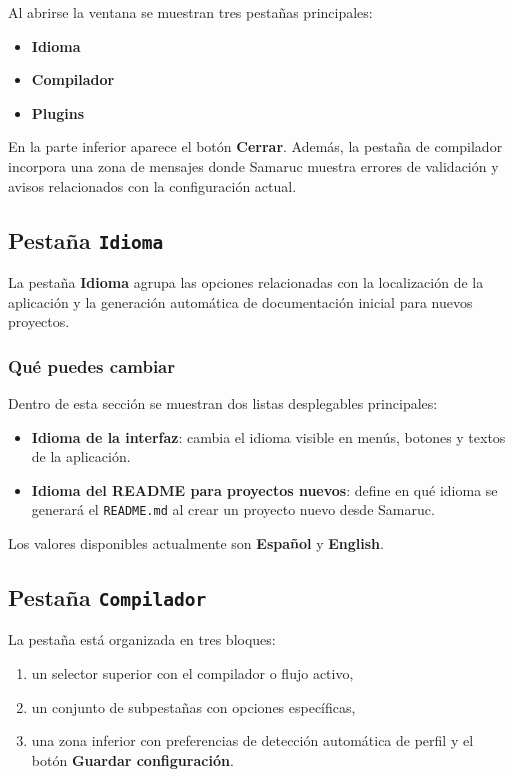 \documentclass[../../main.tex]{subfiles}
\begin{document}
Al abrirse la ventana se muestran tres pestañas principales:

\begin{itemize}
    \item \textbf{Idioma}
    \item \textbf{Compilador}
    \item \textbf{Plugins}
\end{itemize}

En la parte inferior aparece el botón \textbf{Cerrar}. Además, la pestaña de compilador incorpora una zona de mensajes donde Samaruc muestra errores de validación y avisos relacionados con la configuración actual.

\subsection{Pestaña \texttt{Idioma}}

La pestaña \textbf{Idioma} agrupa las opciones relacionadas con la localización de la aplicación y la generación automática de documentación inicial para nuevos proyectos.

\subsubsection{Qué puedes cambiar}

Dentro de esta sección se muestran dos listas desplegables principales:

\begin{itemize}
    \item \textbf{Idioma de la interfaz}: cambia el idioma visible en menús, botones y textos de la aplicación.
    \item \textbf{Idioma del README para proyectos nuevos}: define en qué idioma se generará el \texttt{README.md} al crear un proyecto nuevo desde Samaruc.
\end{itemize}

Los valores disponibles actualmente son \textbf{Español} y \textbf{English}.

\clearpage

\subsection{Pestaña \texttt{Compilador}}

La pestaña está organizada en tres bloques:

\begin{enumerate}
    \item un selector superior con el compilador o flujo activo,
    \item un conjunto de subpestañas con opciones específicas,
    \item una zona inferior con preferencias de detección automática de perfil y el botón \textbf{Guardar configuración}.
\end{enumerate}
\end{document}
